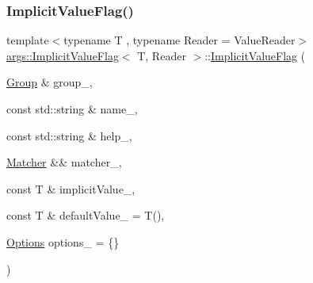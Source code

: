 \subsubsection{\texorpdfstring{Implicit\+Value\+Flag()}{ImplicitValueFlag()}\hspace{0.1cm}{\footnotesize\ttfamily [1/3]}}
{\footnotesize\ttfamily template$<$typename T , typename Reader  = Value\+Reader$>$ \\
\hyperlink{classargs_1_1_implicit_value_flag}{args\+::\+Implicit\+Value\+Flag}$<$ T, Reader $>$\+::\hyperlink{classargs_1_1_implicit_value_flag}{Implicit\+Value\+Flag} (\begin{DoxyParamCaption}\item[{\hyperlink{classargs_1_1_group}{Group} \&}]{group\+\_\+,  }\item[{const std\+::string \&}]{name\+\_\+,  }\item[{const std\+::string \&}]{help\+\_\+,  }\item[{\hyperlink{classargs_1_1_matcher}{Matcher} \&\&}]{matcher\+\_\+,  }\item[{const T \&}]{implicit\+Value\+\_\+,  }\item[{const T \&}]{default\+Value\+\_\+ = {\ttfamily T()},  }\item[{\hyperlink{namespaceargs_aa530c0f95194aa275f49a5f299ac9e77}{Options}}]{options\+\_\+ = {\ttfamily \{\}} }\end{DoxyParamCaption})\hspace{0.3cm}{\ttfamily [inline]}}

\mbox{\label{classargs_1_1_implicit_value_flag_aa2dd8fbab60032df5027d80962a5743d}} 
